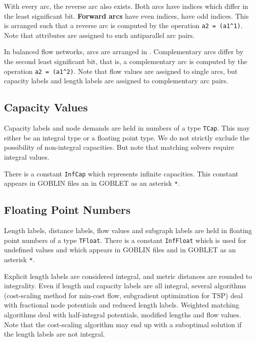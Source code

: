 \documentclass[a4paper,11pt,twoside]{book}
\begin{document}
\begin{multicols}{2}
With every arc, the reverse arc also exists. Both arcs have indices which
differ in the least significant bit. {\bf Forward arcs}
have even indices,
 have odd indices. This is arranged such that a reverse arc
is computed by the operation \verb/a2 = (a1^1)/. Note that attributes are
assigned to such antiparallel arc pairs.

In balanced flow networks, arcs are arranged in .
Complementary arcs differ by the second least significant bit, that is, a
complementary arc is computed by the operation \verb/a2 = (a1^2)/. Note that
flow values are assigned to single arcs, but capacity labels and length
labels are assigned to complementary arc pairs.


\subsection{Capacity Values}

Capacity labels and node demands are held in numbers of a type \verb/TCap/.
This may either be an integral type or a floating point type. We do not strictly
exclude the possibility of non-integral capacities. But note that matching solvers
require integral values.

There is a constant \verb/InfCap/ which represents infinite capacities.
This constant appears in GOBLIN files an in GOBLET as an asterisk \verb/*/.


\subsection{Floating Point Numbers}

Length labels, distance labels, flow values and subgraph labels are held in
floating point numbers of a type \verb/TFloat/. There is a constant
\verb/InfFloat/ which is used for undefined values and which appears in GOBLIN
files and in GOBLET as an asterisk \verb/*/.

Explicit length labels are considered integral, and metric distances are roun\-ded
to integrality. Even if length and capacity labels are all integral, several
algorithms (cost-scaling method for min-cost flow, subgradient optimization for
TSP) deal with fractional node potentials and reduced length labels. Weighted
matching algorithms deal with half-integral potentials, modified lengths and
flow values. Note that the cost-scaling algorithm may end up with a suboptimal
solution if the length labels are not integral.



\end{multicols}
\end{document}
